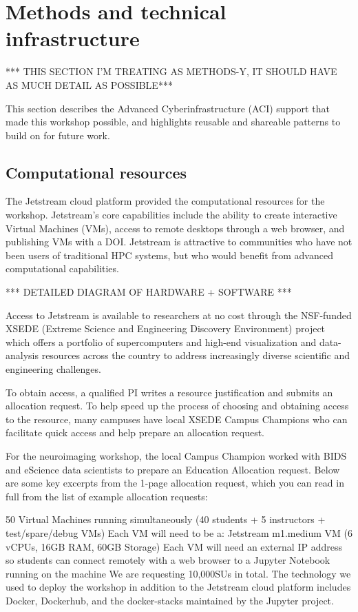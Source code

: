 \section{Methods and technical infrastructure}\label{sec:methods}

*** THIS SECTION I'M TREATING AS METHODS-Y, IT SHOULD HAVE AS MUCH DETAIL AS POSSIBLE***


This section describes the Advanced Cyberinfrastructure (ACI) support that made this workshop possible, and highlights reusable and shareable patterns to build on for future work.

\subsection{Computational resources}

The Jetstream cloud platform provided the computational resources for the
workshop. Jetstream’s core capabilities include the ability to create
interactive Virtual Machines (VMs), access to remote desktops through a web
browser, and publishing VMs with a DOI. Jetstream is attractive to communities
who have not been users of traditional HPC systems, but who would benefit from
advanced computational capabilities.

*** DETAILED DIAGRAM OF HARDWARE + SOFTWARE ***

Access to Jetstream is available to researchers at no cost through the
NSF-funded XSEDE (Extreme Science and Engineering Discovery Environment) project
which offers a portfolio of supercomputers and high-end visualization and
data-analysis resources across the country to address increasingly diverse
scientific and engineering challenges.

To obtain access, a qualified PI writes a resource justification and submits an
allocation request. To help speed up the process of choosing and obtaining
access to the resource, many campuses have local XSEDE Campus Champions who can
facilitate quick access and help prepare an allocation request.

For the neuroimaging workshop, the local Campus Champion worked with BIDS and
eScience data scientists to prepare an Education Allocation request. Below are
some key excerpts from the 1-page allocation request, which you can read in full
from the list of example allocation requests:

50 Virtual Machines running simultaneously (40 students + 5 instructors +
test/spare/debug VMs) Each VM will need to be a: Jetstream m1.medium VM (6
vCPUs, 16GB RAM, 60GB Storage) Each VM will need an external IP address so
students can connect remotely with a web browser to a Jupyter Notebook running
on the machine We are requesting 10,000SUs in total. The technology we used to
deploy the workshop in addition to the Jetstream cloud platform includes Docker,
Dockerhub, and the docker-stacks maintained by the Jupyter project.

